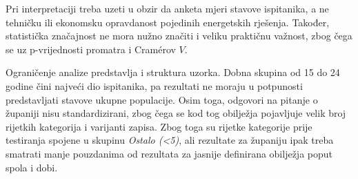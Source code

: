 Pri interpretaciji treba uzeti u obzir da anketa mjeri stavove ispitanika, a ne tehničku ili ekonomsku opravdanost pojedinih energetskih rješenja. Također, statistička značajnost ne mora nužno značiti i veliku praktičnu važnost, zbog čega se uz p-vrijednosti promatra i Cramérov \(V\).

Ograničenje analize predstavlja i struktura uzorka. Dobna skupina od 15 do 24 godine čini najveći dio ispitanika, pa rezultati ne moraju u potpunosti predstavljati stavove ukupne populacije. Osim toga, odgovori na pitanje o županiji nisu standardizirani, zbog čega se kod tog obilježja pojavljuje velik broj rijetkih kategorija i varijanti zapisa. Zbog toga su rijetke kategorije prije testiranja spojene u skupinu \textit{Ostalo (<5)}, ali rezultate za županiju ipak treba smatrati manje pouzdanima od rezultata za jasnije definirana obilježja poput spola i dobi.
